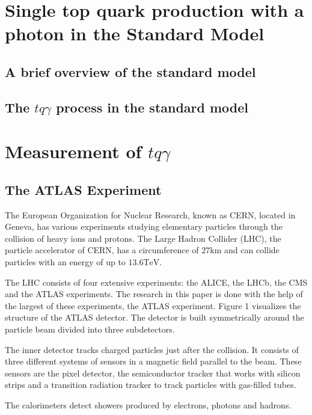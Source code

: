 \chapter{Single top quark production with a photon in the Standard Model}
\section{A brief overview of the standard model}
\section{The \texorpdfstring{$tq\gamma$}{TEXT} process in the standard model}


\chapter{Measurement of \texorpdfstring{$tq\gamma$}{TEXT}}



\section{The ATLAS Experiment}

The European Organization for Nuclear Research, known as CERN, located in Geneva, has various experiments studying elementary particles through the collision of heavy ions and protons. 
The Large Hadron Collider (LHC), the particle accelerator of CERN, has a circumference of $27 \si{\kilo\metre}$ and can collide particles with an energy of up to $13.6 \si{\tera\electronvolt}$.

The LHC consists of four extensive experiments: the ALICE, the LHCb, the CMS and the ATLAS experiments. The research in this paper is done with the help of the largest of these experiments, the ATLAS experiment. Figure 1 visualizes the structure of the ATLAS detector.  The detector is built symmetrically around the particle beam divided into three subdetectors.

The inner detector tracks charged particles just after the collision. It consists of three different systems of sensors in a magnetic field parallel to the beam. These sensors are the pixel detector, the semiconductor tracker that works with silicon strips and a transition radiation tracker to track particles with gas-filled tubes. 

The calorimeters detect showers produced by electrons, photons and hadrons. 

